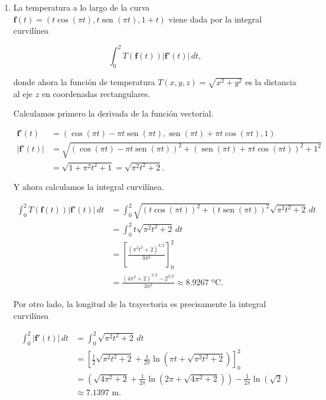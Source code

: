 \documentclass[
  spanish,
  a4paper,
]{scrreport}
\theoremstyle{definition}
\theoremstyle{remark}
\begin{document}
\begin{tcolorbox}
\begin{enumerate}
  \[
  \overline{T} = \frac{T}{V} = \frac{\frac{40\pi}{3}}{\frac{28\pi}{3}} = \frac{10}{7} \mbox{ ºC}.
  \]
\item
  La temperatura a lo largo de la curva
  \(\mathbf{f}(t) = (t\cos(\pi t),t\operatorname{sen}(\pi t), 1+t)\)
  viene dada por la integral curvilínea

  \[
  \int_0^2 T(\mathbf{f}(t)) |\mathbf{f}'(t)| \, dt,
  \]

  donde ahora la función de temperatura
  \(T(x, y, z) = \sqrt{x^2 + y^2}\) es la distancia al eje \(z\) en
  coordenadas rectangulares.

  Calculamos primero la derivada de la función vectorial.

  \begin{align*}
  \mathbf{f}'(t) &= \left( \cos(\pi t) - \pi t \operatorname{sen}(\pi t), \operatorname{sen}(\pi t) + \pi t \cos(\pi t), 1 \right) \\
  |\mathbf{f}'(t)| &= \sqrt{(\cos(\pi t) - \pi t \operatorname{sen}(\pi t))^2 + (\operatorname{sen}(\pi t) + \pi t \cos(\pi t))^2 + 1^2} \\
  &= \sqrt{1 + \pi^2 t^2 + 1} 
  = \sqrt{\pi^2 t^2 + 2}.
  \end{align*}

  Y ahora calculamos la integral curvilínea.

  \begin{align*}
  \int_0^2 T(\mathbf{f}(t)) |\mathbf{f}'(t)| \, dt 
  &= \int_0^2 \sqrt{(t\cos(\pi t))^2 + (t\operatorname{sen}(\pi t))^2} \sqrt{\pi^2 t^2 + 2} \, dt \\
  &= \int_0^2 t \sqrt{\pi^2 t^2 + 2} \, dt \\
  &= \left[ \frac{(\pi^2 t^2 + 2)^{3/2}}{3\pi^2} \right]_0^2 \\
  &= \frac{(4\pi^2 + 2)^{3/2} - 2^{3/2}}{3\pi^2} \approx 8.9267 \mbox{ ºC}.
  \end{align*}

  Por otro lado, la longitud de la trayectoria es precisamente la
  integral curvilínea

  \begin{align*}
  \int_0^2 |\mathbf{f}'(t)| \, dt 
  &= \int_0^2 \sqrt{\pi^2 t^2 + 2} \, dt \\
  &= \left[ \frac{t}{2}\sqrt{\pi^2 t^2 + 2} + \frac{1}{2\pi}\ln\left(\pi t + \sqrt{\pi^2 t^2 + 2}\right) \right]_0^2 \tag{1}\\
  &= \left( \sqrt{4\pi^2 + 2} + \frac{1}{2\pi}\ln\left(2\pi + \sqrt{4\pi^2 + 2}\right) \right) - \frac{1}{2\pi}\ln(\sqrt{2}) \\
  &\approx 7.1397 \mbox{ m}.
  \end{align*}


\end{enumerate}
\end{tcolorbox}
\end{document}
